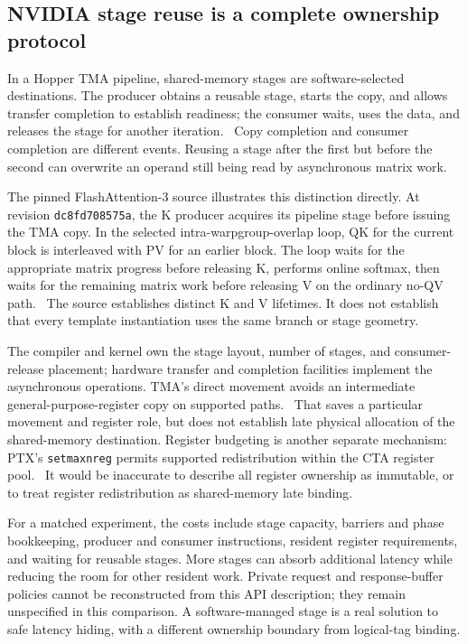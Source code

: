 \subsection{NVIDIA stage reuse is a complete ownership protocol}

In a Hopper TMA pipeline, shared-memory stages are software-selected destinations. The producer obtains a reusable stage, starts the copy, and allows transfer completion to establish readiness; the consumer waits, uses the data, and releases the stage for another iteration.~\citep{u002-cutlass} Copy completion and consumer completion are different events. Reusing a stage after the first but before the second can overwrite an operand still being read by asynchronous matrix work.

The pinned FlashAttention-3 source illustrates this distinction directly. At revision \texttt{dc8fd708575a}, the K producer acquires its pipeline stage before issuing the TMA copy. In the selected intra-warpgroup-overlap loop, QK for the current block is interleaved with PV for an earlier block. The loop waits for the appropriate matrix progress before releasing K, performs online softmax, then waits for the remaining matrix work before releasing V on the ordinary no-QV path.~\citep{u002-fa3-mainloop} The source establishes distinct K and V lifetimes. It does not establish that every template instantiation uses the same branch or stage geometry.

The compiler and kernel own the stage layout, number of stages, and consumer-release placement; hardware transfer and completion facilities implement the asynchronous operations. TMA's direct movement avoids an intermediate general-purpose-register copy on supported paths.~\citep{u002-cuda-async} That saves a particular movement and register role, but does not establish late physical allocation of the shared-memory destination. Register budgeting is another separate mechanism: PTX's \texttt{setmaxnreg} permits supported redistribution within the CTA register pool.~\citep{u002-setmaxnreg} It would be inaccurate to describe all register ownership as immutable, or to treat register redistribution as shared-memory late binding.

For a matched experiment, the costs include stage capacity, barriers and phase bookkeeping, producer and consumer instructions, resident register requirements, and waiting for reusable stages. More stages can absorb additional latency while reducing the room for other resident work. Private request and response-buffer policies cannot be reconstructed from this API description; they remain unspecified in this comparison. A software-managed stage is a real solution to safe latency hiding, with a different ownership boundary from logical-tag binding.

